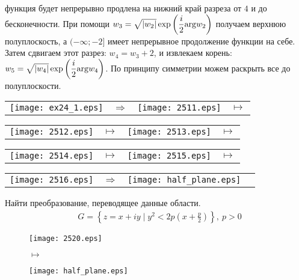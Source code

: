 функция будет непрерывно продлена на нижний край разреза от $4$ и до
бесконечности. При помощи $w_3 = \sqrt{\left| w_2 \right|}\exp \left(
\displaystyle \frac{i}{2}\mathrm{arg} w_2\right)$ получаем верхнюю полуплоскость, а $(-\infty;
-2]$ имеет непрерывное продолжение функции на себе. Затем сдвигаем этот разрез:
$w_4 = w_3+2$, и извлекаем корень: $w_5 = \sqrt{\left| w_4 \right|}\exp \left(
    \displaystyle \frac{i}{2}\mathrm{arg} w_4\right)$. По принципу симметрии можем раскрыть все
до полуплоскости.
\begin{center}
    \begin{tabular}{cccc}
      \texttt{[image: ex24\_1.eps]} & $\Rightarrow$ & \texttt{[image: 2511.eps]} & $\mapsto$ \\
    \end{tabular}
\end{center}
\begin{center}
    \begin{tabular}{cccc}
      \texttt{[image: 2512.eps]} & $\mapsto$ & \texttt{[image: 2513.eps]} & $\mapsto$ \\
    \end{tabular}
\end{center}
\begin{center}
    \begin{tabular}{cccc}
      \texttt{[image: 2514.eps]} & $\mapsto$ & \texttt{[image: 2515.eps]} & $\mapsto$ \\
    \end{tabular}
\end{center}
\begin{center}
    \begin{tabular}{cccc}
      \texttt{[image: 2516.eps]} & $\Rightarrow$ & \texttt{[image: half\_plane.eps]} & \\
    \end{tabular}
\end{center}
\Example
Найти преобразование, переводящее данные области.
\begin{align*}
  & G = \left\{ z = x+iy \mid y^2 < 2p \left( x+\frac{p}{2} \right) \right\}, \ p > 0
\end{align*}
\begin{figure}[h!]
    \begin{minipage}[c]{0.45\textwidth}
        \centering
        \texttt{[image: 2520.eps]}
    \end{minipage}
    \begin{minipage}[c]{0.1\textwidth}
        \centering
        \LARGE{$\mapsto$}
    \end{minipage}
    \begin{minipage}[c]{0.45\textwidth}
        \centering
        \texttt{[image: half\_plane.eps]}
    \end{minipage}
    \label{fig:25.1}
\end{figure}
